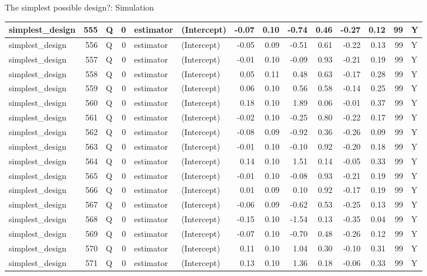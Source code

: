 \documentclass[
  11pt,
  ignorenonframetext,
]{beamer}
\begin{document}
\begin{frame}[fragile]{The simplest possible design?: Simulation}
\begin{tabular}{l|r|l|r|l|l|r|r|r|r|r|r|r|l}
\hline
simplest\_design & 555 & Q & 0 & estimator & (Intercept) & -0.07 & 0.10 & -0.74 & 0.46 & -0.27 & 0.12 & 99 & Y\\
\hline
simplest\_design & 556 & Q & 0 & estimator & (Intercept) & -0.05 & 0.09 & -0.51 & 0.61 & -0.22 & 0.13 & 99 & Y\\
\hline
simplest\_design & 557 & Q & 0 & estimator & (Intercept) & -0.01 & 0.10 & -0.09 & 0.93 & -0.21 & 0.19 & 99 & Y\\
\hline
simplest\_design & 558 & Q & 0 & estimator & (Intercept) & 0.05 & 0.11 & 0.48 & 0.63 & -0.17 & 0.28 & 99 & Y\\
\hline
simplest\_design & 559 & Q & 0 & estimator & (Intercept) & 0.06 & 0.10 & 0.56 & 0.58 & -0.14 & 0.25 & 99 & Y\\
\hline
simplest\_design & 560 & Q & 0 & estimator & (Intercept) & 0.18 & 0.10 & 1.89 & 0.06 & -0.01 & 0.37 & 99 & Y\\
\hline
simplest\_design & 561 & Q & 0 & estimator & (Intercept) & -0.02 & 0.10 & -0.25 & 0.80 & -0.22 & 0.17 & 99 & Y\\
\hline
simplest\_design & 562 & Q & 0 & estimator & (Intercept) & -0.08 & 0.09 & -0.92 & 0.36 & -0.26 & 0.09 & 99 & Y\\
\hline
simplest\_design & 563 & Q & 0 & estimator & (Intercept) & -0.01 & 0.10 & -0.10 & 0.92 & -0.20 & 0.18 & 99 & Y\\
\hline
simplest\_design & 564 & Q & 0 & estimator & (Intercept) & 0.14 & 0.10 & 1.51 & 0.14 & -0.05 & 0.33 & 99 & Y\\
\hline
simplest\_design & 565 & Q & 0 & estimator & (Intercept) & -0.01 & 0.10 & -0.08 & 0.93 & -0.21 & 0.19 & 99 & Y\\
\hline
simplest\_design & 566 & Q & 0 & estimator & (Intercept) & 0.01 & 0.09 & 0.10 & 0.92 & -0.17 & 0.19 & 99 & Y\\
\hline
simplest\_design & 567 & Q & 0 & estimator & (Intercept) & -0.06 & 0.09 & -0.62 & 0.53 & -0.25 & 0.13 & 99 & Y\\
\hline
simplest\_design & 568 & Q & 0 & estimator & (Intercept) & -0.15 & 0.10 & -1.54 & 0.13 & -0.35 & 0.04 & 99 & Y\\
\hline
simplest\_design & 569 & Q & 0 & estimator & (Intercept) & -0.07 & 0.10 & -0.70 & 0.48 & -0.26 & 0.12 & 99 & Y\\
\hline
simplest\_design & 570 & Q & 0 & estimator & (Intercept) & 0.11 & 0.10 & 1.04 & 0.30 & -0.10 & 0.31 & 99 & Y\\
\hline
simplest\_design & 571 & Q & 0 & estimator & (Intercept) & 0.13 & 0.10 & 1.36 & 0.18 & -0.06 & 0.33 & 99 & Y\\

\end{tabular}
\end{frame}
\end{document}
